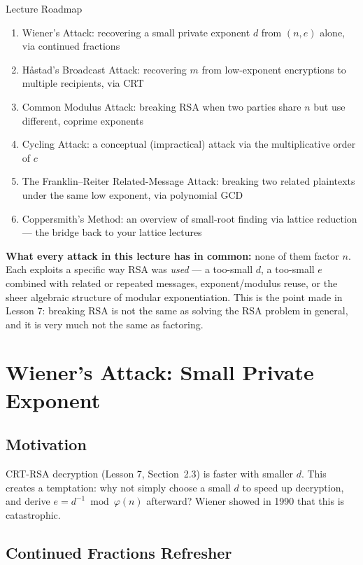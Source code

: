 \vspace{0.5cm}
\begin{keybox}{Lecture Roadmap}
\begin{enumerate}[label=(\arabic*)]
\item Wiener's Attack: recovering a small private exponent $d$ from $(n,e)$ alone, via continued fractions
\item Håstad's Broadcast Attack: recovering $m$ from low-exponent encryptions to multiple recipients, via CRT
\item Common Modulus Attack: breaking RSA when two parties share $n$ but use different, coprime exponents
\item Cycling Attack: a conceptual (impractical) attack via the multiplicative order of $c$
\item The Franklin--Reiter Related-Message Attack: breaking two related plaintexts under the same low exponent, via polynomial GCD
\item Coppersmith's Method: an overview of small-root finding via lattice reduction — the bridge back to your lattice lectures
\end{enumerate}
\textbf{What every attack in this lecture has in common:} none of them factor $n$. Each exploits a specific way RSA was \emph{used} — a too-small $d$, a too-small $e$ combined with related or repeated messages, exponent/modulus reuse, or the sheer algebraic structure of modular exponentiation. This is the point made in Lesson 7: breaking RSA is not the same as solving the RSA problem in general, and it is very much not the same as factoring.
\end{keybox}

\newpage
\section{Wiener's Attack: Small Private Exponent}

\subsection{Motivation}
CRT-RSA decryption (Lesson 7, Section~2.3) is faster with smaller $d$. This creates a temptation: why not simply choose a small $d$ to speed up decryption, and derive $e = d^{-1} \bmod \varphi(n)$ afterward? Wiener showed in 1990 that this is catastrophic.

\subsection{Continued Fractions Refresher}

